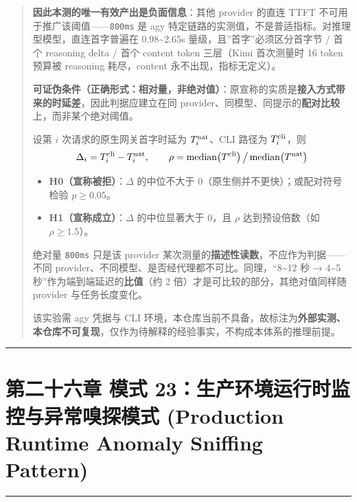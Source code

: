 \documentclass[
]{ctexart}
\providecommand{\tightlist}{%
  \setlength{\itemsep}{0pt}\setlength{\parskip}{0pt}}
\renewcommand{\_}{\discretionary{}{}{\textunderscore}}
\renewcommand{\text}[1]{\textnormal{#1}}
\let\oldsection\section
\renewcommand{\section}{\clearpage\oldsection}
\begin{document}
\begin{quote}
\textbf{因此本测的唯一有效产出是负面信息}：其他 provider 的直连 TTFT
不可用于推广该阈值------\texttt{800ms} 是 agy
特定链路的实测值，不是普适指标。对推理型模型，直连首字普遍在
0.98\textasciitilde2.65s 量级，且''首字''必须区分首字节 / 首个 reasoning
delta / 首个 content token 三层（Kimi 首次测量时 16 token 预算被
reasoning 耗尽，content 永不出现，指标无定义）。

\textbf{可证伪条件（正确形式：相对量，非绝对值）}：原宣称的实质是\textbf{接入方式带来的时延差}，因此判据应建立在同
provider、同模型、同提示的\textbf{配对比较}上，而非某个绝对阈值。

设第 \(i\) 次请求的原生网关首字时延为 \(T^{\text{nat}}_i\)、CLI 路径为
\(T^{\text{cli}}_i\)，则
\[\Delta_i=T^{\text{cli}}_i-T^{\text{nat}}_i,\qquad \rho=\operatorname{median}\!\left(T^{\text{cli}}\right)\big/\operatorname{median}\!\left(T^{\text{nat}}\right)\]

\begin{itemize}
\tightlist
\item
  \textbf{H0（宣称被拒）}：\(\Delta\) 的中位不大于
  0（原生侧并不更快）；或配对符号检验 \(p\ge0.05\)。
\item
  \textbf{H1（宣称成立）}：\(\Delta\) 的中位显著大于 0，且 \(\rho\)
  达到预设倍数（如 \(\rho\ge1.5\)）。
\end{itemize}

绝对量 \texttt{800ms} 只是该 provider
某次测量的\textbf{描述性读数}，不应作为判据------不同
provider、不同模型、是否经代理都不可比。同理，``8\textasciitilde12 秒 →
4\textasciitilde5 秒''作为端到端延迟的\textbf{比值}（约 2
倍）才是可比较的部分，其绝对值同样随 provider 与任务长度变化。

该实验需 agy 凭据与 CLI
环境，本仓库当前不具备，故标注为\textbf{外部实测、本仓库不可复现}，仅作为待解释的经验事实，不构成本体系的推理前提。
\end{quote}

\begin{center}\rule{0.5\linewidth}{0.5pt}\end{center}

\section{第二十六章 模式 23：生产环境运行时监控与异常嗅探模式 (Production Runtime
Anomaly Sniffing
Pattern)}\label{ux6a21ux5f0f-23ux751fux4ea7ux73afux5883ux8fd0ux884cux65f6ux76d1ux63a7ux4e0eux5f02ux5e38ux55c5ux63a2ux6a21ux5f0f-production-runtime-anomaly-sniffing-pattern}

\begin{center}\rule{0.5\linewidth}{0.5pt}\end{center}
\end{document}
